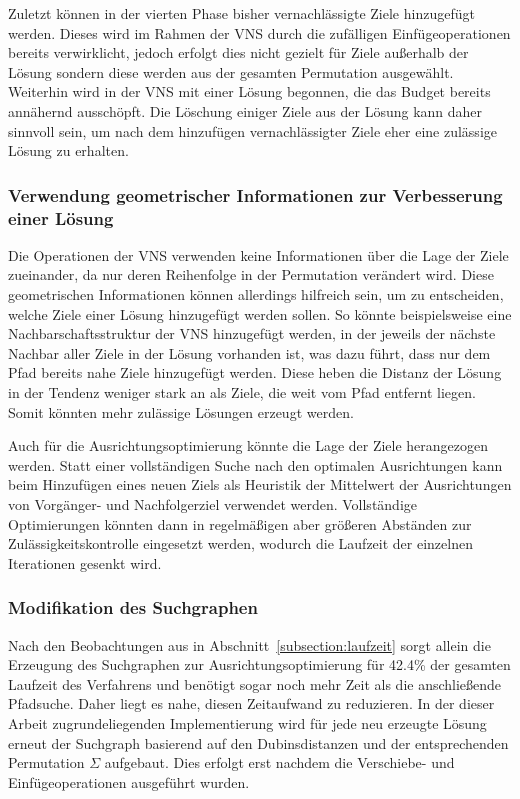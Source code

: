 \documentclass[12pt,a4paper,twoside]{article}
\theoremstyle{definition}
\numberwithin{equation}{section}
\begin{document}
Zuletzt können in der vierten Phase bisher vernachlässigte Ziele hinzugefügt werden. Dieses wird im Rahmen der VNS durch die zufälligen Einfügeoperationen bereits verwirklicht, jedoch erfolgt dies nicht gezielt für Ziele außerhalb der Lösung sondern diese werden aus der gesamten Permutation ausgewählt. Weiterhin wird in der VNS mit einer Lösung begonnen, die das Budget bereits annähernd ausschöpft. Die Löschung einiger Ziele aus der Lösung kann daher sinnvoll sein, um nach dem hinzufügen vernachlässigter Ziele eher eine zulässige Lösung zu erhalten.

\subsubsection{Verwendung geometrischer Informationen zur Verbesserung einer Lösung}\label{subsubsec:useGeometry}
Die Operationen der VNS verwenden keine Informationen über die Lage der Ziele zueinander, da nur deren Reihenfolge in der Permutation verändert wird. Diese geometrischen Informationen können allerdings hilfreich sein, um zu entscheiden, welche Ziele einer Lösung hinzugefügt werden sollen. So könnte beispielsweise eine Nachbarschaftsstruktur der VNS hinzugefügt werden, in der jeweils der nächste Nachbar aller Ziele in der Lösung vorhanden ist, was dazu führt, dass nur dem Pfad bereits nahe Ziele hinzugefügt werden. Diese heben die Distanz der Lösung in der Tendenz weniger stark an als Ziele, die weit vom Pfad entfernt liegen. Somit könnten mehr zulässige Lösungen erzeugt werden.

Auch für die Ausrichtungsoptimierung könnte die Lage der Ziele herangezogen werden. Statt einer vollständigen Suche nach den optimalen Ausrichtungen kann beim Hinzufügen eines neuen Ziels als Heuristik der Mittelwert der Ausrichtungen von Vorgänger- und Nachfolgerziel verwendet werden. Vollständige Optimierungen könnten dann in regelmäßigen aber größeren Abständen zur Zulässigkeitskontrolle eingesetzt werden, wodurch die Laufzeit der einzelnen Iterationen gesenkt wird.

\subsubsection{Modifikation des Suchgraphen}\label{subsubsec:modifySearchGraph}
Nach den Beobachtungen aus in Abschnitt~\ref{subsection:laufzeit} sorgt allein die Erzeugung des Suchgraphen zur Ausrichtungsoptimierung für 42.4\% der gesamten Laufzeit des Verfahrens und benötigt sogar noch mehr Zeit als die anschließende Pfadsuche. Daher liegt es nahe, diesen Zeitaufwand zu reduzieren. In der dieser Arbeit zugrundeliegenden Implementierung wird für jede neu erzeugte Lösung erneut der Suchgraph basierend auf den Dubinsdistanzen und der entsprechenden Permutation $\Sigma$ aufgebaut. Dies erfolgt erst nachdem die Verschiebe- und Einfügeoperationen ausgeführt wurden.
\end{document}
